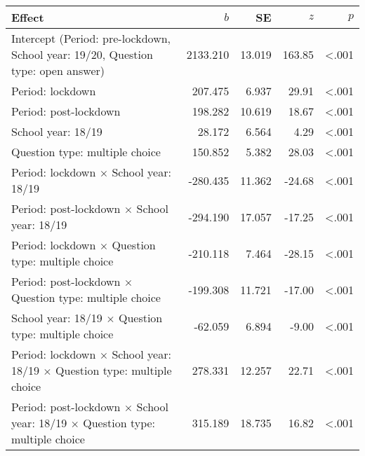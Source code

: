 
\begin{tabular}{lrrrr}
\toprule
Effect & $b$ & SE & $z$ & $p$\\
\midrule
Intercept \small{(Period: pre-lockdown, School year: 19/20, Question type: open answer)} & 2133.210 & 13.019 & 163.85 & <.001\\
Period: lockdown & 207.475 & 6.937 & 29.91 & <.001\\
Period: post-lockdown & 198.282 & 10.619 & 18.67 & <.001\\
School year: 18/19 & 28.172 & 6.564 & 4.29 & <.001\\
Question type: multiple choice & 150.852 & 5.382 & 28.03 & <.001\\
\addlinespace
Period: lockdown $\times$ School year: 18/19 & -280.435 & 11.362 & -24.68 & <.001\\
Period: post-lockdown $\times$ School year: 18/19 & -294.190 & 17.057 & -17.25 & <.001\\
Period: lockdown $\times$ Question type: multiple choice & -210.118 & 7.464 & -28.15 & <.001\\
Period: post-lockdown $\times$ Question type: multiple choice & -199.308 & 11.721 & -17.00 & <.001\\
School year: 18/19 $\times$ Question type: multiple choice & -62.059 & 6.894 & -9.00 & <.001\\
\addlinespace
Period: lockdown $\times$ School year: 18/19 $\times$ Question type: multiple choice & 278.331 & 12.257 & 22.71 & <.001\\
Period: post-lockdown $\times$ School year: 18/19 $\times$ Question type: multiple choice & 315.189 & 18.735 & 16.82 & <.001\\
\bottomrule
\end{tabular}